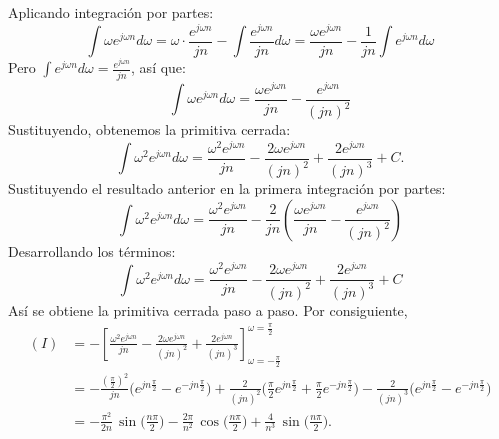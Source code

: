 \documentclass[
  11pt,
  letterpaper,
   addpoints,
   answers
  ]{exam}
\begin{document}
\begin{questions}
\begin{solution}
Aplicando integración por partes:
\[
\int \omega e^{j\omega n}d\omega = \omega \cdot \frac{e^{j\omega n}}{j n} - \int \frac{e^{j\omega n}}{j n} d\omega = \frac{\omega e^{j\omega n}}{j n} - \frac{1}{j n} \int e^{j\omega n} d\omega
\]
Pero $\int e^{j\omega n} d\omega = \frac{e^{j\omega n}}{j n}$, así que:
\[
\int \omega e^{j\omega n}d\omega = \frac{\omega e^{j\omega n}}{j n} - \frac{e^{j\omega n}}{(j n)^2}
\]
Sustituyendo, obtenemos la primitiva cerrada:
\[
\int \omega^2 e^{j\omega n}d\omega
=\frac{\omega^2 e^{j\omega n}}{j n}-\frac{2\omega e^{j\omega n}}{(j n)^2}
+\frac{2 e^{j\omega n}}{(j n)^3}+C.
\]
Sustituyendo el resultado anterior en la primera integración por partes:
\[
\int \omega^2 e^{j\omega n}d\omega = \frac{\omega^2 e^{j\omega n}}{j n} - \frac{2}{j n} \left( \frac{\omega e^{j\omega n}}{j n} - \frac{e^{j\omega n}}{(j n)^2} \right )
\]
Desarrollando los términos:
\[
\int \omega^2 e^{j\omega n}d\omega = \frac{\omega^2 e^{j\omega n}}{j n} - \frac{2\omega e^{j\omega n}}{(j n)^2} + \frac{2 e^{j\omega n}}{(j n)^3} + C
\]
Así se obtiene la primitiva cerrada paso a paso.
Por consiguiente,
\begin{align*}
(I)
&=-\left[\frac{\omega^2 e^{j\omega n}}{j n}-\frac{2\omega e^{j\omega n}}{(j n)^2}
+\frac{2 e^{j\omega n}}{(j n)^3}\right]_{\omega=-\frac{\pi}{2}}^{\omega=\frac{\pi}{2}}\\[1mm]
&=-\frac{\left(\frac{\pi}{2}\right)^2}{j n}\Big(e^{j n\frac{\pi}{2}}-e^{-j n\frac{\pi}{2}}\Big)
+\frac{2}{(j n)^2}\Big(\tfrac{\pi}{2}e^{j n\frac{\pi}{2}}+\tfrac{\pi}{2}e^{-j n\frac{\pi}{2}}\Big)
-\frac{2}{(j n)^3}\Big(e^{j n\frac{\pi}{2}}-e^{-j n\frac{\pi}{2}}\Big)\\[1mm]
&=-\frac{\pi^2}{2n}\,\sin\!\Big(\frac{n\pi}{2}\Big)
-\frac{2\pi}{n^2}\,\cos\!\Big(\frac{n\pi}{2}\Big)
+\frac{4}{n^3}\,\sin\!\Big(\frac{n\pi}{2}\Big).
\end{align*}


\end{solution}
\end{questions}
\end{document}

